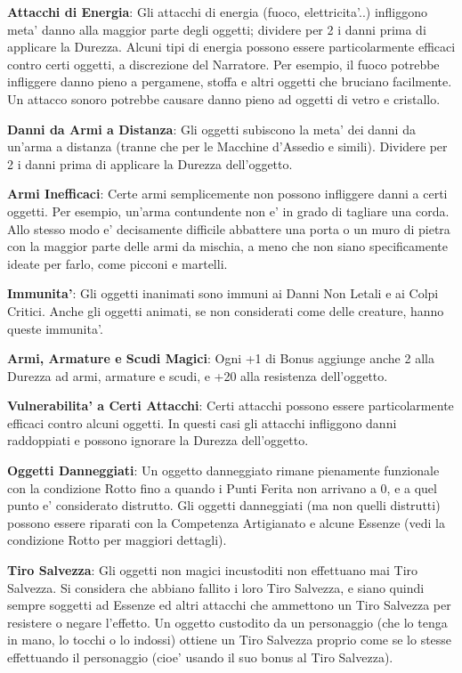 \documentclass[a4paper,11pt,twoside,openany]{book}
\begin{document}
{\bigskip

\textbf{Attacchi di Energia}: Gli attacchi di energia (fuoco, elettricita'..) infliggono meta' danno alla maggior parte degli oggetti; dividere per 2 i danni prima di applicare la Durezza. Alcuni tipi di energia possono essere particolarmente efficaci contro certi oggetti, a discrezione del Narratore. Per esempio, il fuoco potrebbe infliggere danno pieno a pergamene, stoffa e altri oggetti che bruciano facilmente. Un attacco sonoro potrebbe causare danno pieno ad oggetti di vetro e cristallo.

\textbf{Danni da Armi a Distanza}: Gli oggetti subiscono la meta' dei danni da un'arma a distanza (tranne che per le Macchine d'Assedio e simili). Dividere per 2 i danni prima di applicare la Durezza dell'oggetto.

\textbf{Armi Inefficaci}: Certe armi semplicemente non possono infliggere danni a certi oggetti. Per esempio, un'arma contundente non e' in grado di tagliare una corda. Allo stesso modo e' decisamente difficile abbattere una porta o un muro di pietra con la maggior parte delle armi da mischia, a meno che non siano specificamente ideate per farlo, come picconi e martelli.

\textbf{Immunita'}: Gli oggetti inanimati sono immuni ai Danni Non Letali e ai Colpi Critici. Anche gli oggetti animati, se non considerati come delle creature, hanno queste immunita'.

\textbf{Armi, Armature e Scudi Magici}: Ogni +1 di Bonus aggiunge anche 2 alla Durezza ad armi, armature e scudi, e +20 alla resistenza dell'oggetto.

\textbf{Vulnerabilita' a Certi Attacchi}: Certi attacchi possono essere particolarmente efficaci contro alcuni oggetti. In questi casi gli attacchi infliggono danni raddoppiati e possono ignorare la Durezza dell'oggetto.

\textbf{Oggetti Danneggiati}: Un oggetto danneggiato rimane pienamente funzionale con la condizione Rotto fino a quando i Punti Ferita non arrivano a 0, e a quel punto e' considerato distrutto. Gli oggetti danneggiati (ma non quelli distrutti) possono essere riparati con la Competenza Artigianato e alcune Essenze (vedi la condizione Rotto per maggiori dettagli).

\textbf{Tiro Salvezza}: Gli oggetti non magici incustoditi non effettuano
mai Tiro Salvezza. Si considera che abbiano fallito i loro Tiro Salvezza,
e siano quindi sempre soggetti ad Essenze ed altri attacchi che ammettono
un Tiro Salvezza per resistere o negare l'effetto. Un oggetto custodito
da un personaggio (che lo tenga in mano, lo tocchi o lo indossi) ottiene
un Tiro Salvezza proprio come se lo stesse effettuando il personaggio
(cioe' usando il suo bonus al Tiro Salvezza).

}
\end{document}
